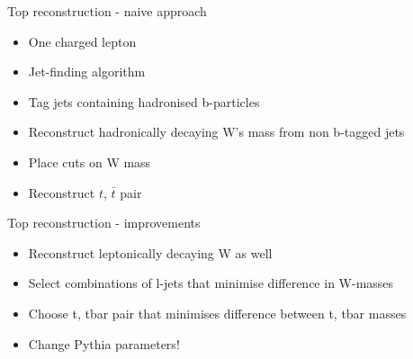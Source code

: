 \documentclass{beamer}
\begin{document}
  \begin{frame}{Top reconstruction - naive approach}
    \begin{itemize}[<uncover@+>]
      \item One charged lepton
      \item Jet-finding algorithm
      \item Tag jets containing hadronised b-particles 
      \item Reconstruct hadronically decaying W's mass from non b-tagged jets
      \item Place cuts on W mass
      \item Reconstruct $t$, $\bar{t}$ pair
    \end{itemize}
  \end{frame}

  \begin{frame}{Top reconstruction - improvements}
    \begin{itemize}[<uncover@+>]
      \item Reconstruct leptonically decaying W as well
      \item Select combinations of l-jets that minimise difference in W-masses
      \item Choose t, tbar pair that minimises difference between t, tbar masses
      \item Change Pythia parameters!
    \end{itemize}
  \end{frame}
\end{document}
